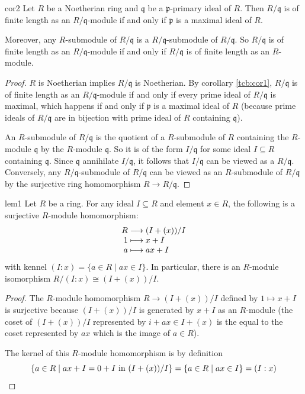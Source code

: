 \documentclass[a4paper,10pt]{article}
\theoremstyle{definition}
\newcommand\cref[2][blue!60!black]{corollary \ref{tcb:#2}}
\begin{document}
\begin{corollary}{}{cor2}
Let $R$ be a Noetherian ring and $\mathfrak{q}$ be a 
$\mathfrak{p}$-primary ideal of $R$.
Then $R/\mathfrak{q}$ is of finite length as an $R/\mathfrak{q}$-module 
if and only if $\mathfrak{p}$ is a maximal ideal of $R$.

Moreover, any $R$-submodule of $R/\mathfrak{q}$ is 
a $R/\mathfrak{q}$-submodule of $R/\mathfrak{q}$.
So $R/\mathfrak{q}$ is of finite length as an $R/\mathfrak{q}$-module 
if and only if $R/\mathfrak{q}$ is of finite length as an $R$-module.
\end{corollary}
\begin{proof}
$R$ is Noetherian implies $R/\mathfrak{q}$ is Noetherian.
By \cref{cor1}, $R/\mathfrak{q}$ 
is of finite length as an $R/\mathfrak{q}$-module if and only if
every prime ideal of $R/\mathfrak{q}$ is maximal,
which happens if and only if $\mathfrak{p}$ is a maximal ideal of $R$
(because prime ideals of $R/\mathfrak{q}$ are in bijection 
with prime ideal of $R$ containing $\mathfrak{q}$).

An $R$-submodule of $R/\mathfrak{q}$ is the quotient of a $R$-submodule of $R$
containing the $R$-module $\mathfrak{q}$ by the $R$-module $\mathfrak{q}$.
So it is of the form $I/\mathfrak{q}$ for some ideal $I\subseteq R$ 
containing $\mathfrak{q}$.
Since $\mathfrak{q}$ annihilate $I/\mathfrak{q}$, it follows that 
$I/\mathfrak{q}$ can be viewed as a $R/\mathfrak{q}$.
Conversely, any $R/\mathfrak{q}$-submodule of $R/\mathfrak{q}$
can be viewed as an $R$-submodule of $R/\mathfrak{q}$ by the 
surjective ring homomorphism $R\to R/\mathfrak{q}$.
\end{proof}

\begin{lemma}{}{lem1}
Let $R$ be a ring.
For any ideal $I\subseteq R$ and element $x\in R$, 
the following is a surjective $R$-module homomorphism:
\begin{equation*}\begin{array}{r@{}c@{}l}
R&{}\longrightarrow{}&(I+(x))/I\\
1&{}\longmapsto{}&x+I\\
a&{}\longmapsto{}&ax+I
\end{array}\end{equation*}
with kennel $(I:x)=\{a\in R\mid ax\in I\}$.
In particular, there is an $R$-module isomorphism 
$R/(I:x)\cong(I+(x))/I$.
\end{lemma}
\begin{proof}
The $R$-module homomorphism $R\to(I+(x))/I$ defined by $1\mapsto x+I$ is 
surjective because $(I+(x))/I$ is generated by $x+I$ as an $R$-module
(the coset of $(I+(x))/I$ represented by $i+ax\in I+(x)$ is the 
equal to the coset represented by $ax$ which is the image of $a\in R$).

The kernel of this $R$-module homomorphism is by definition 
\begin{equation*}
\{a\in R\mid ax+I=0+I\text{ in }(I+(x))/I\}=\{a\in R\mid ax\in I\}=(I:x)\qedhere
\end{equation*}
\end{proof}
\end{document}
